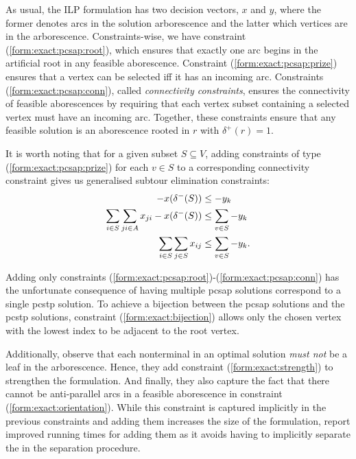  As usual, the ILP formulation has two decision vectors, $x$ and $y$, where the former denotes arcs
 in the solution arborescence and the latter which vertices are in the arborescence. Constraints-wise,
 we have
 constraint (\ref{form:exact:pcsap:root}), which ensures that exactly one arc begins in the artificial
 root in any feasible aborescence. Constraint (\ref{form:exact:pcsap:prize}) ensures
 that a vertex can be selected iff it has an incoming arc.
 Constraints (\ref{form:exact:pcsap:conn}), called \textit{connectivity constraints},
 ensures the connectivity of feasible aborescences by requiring that
 each vertex subset containing a selected vertex must have an incoming arc.
 Together, these constraints ensure that any feasible solution is an aborescence rooted
 in $r$ with $\delta^+(r) = 1$.

 It is worth noting that for a given subset $S \subseteq V$, adding constraints of type
 (\ref{form:exact:pcsap:prize}) for each $v \in S$ to a corresponding connectivity constraint
  gives us generalised subtour elimination constraints:
 \begin{align*}
   -x(\delta^-(S)) &\leq -y_k \\
   \sum_{i \in S} \sum_{ji \in A} x_{ji} - x (\delta^-(S)) &\leq \sum_{v \in S} - y_k \\
   \sum_{i \in S} \sum_{j \in S} x_{ij} &\leq \sum_{v \in S} - y_k \mathnormal{.}
 \end{align*}

 Adding only constraints (\ref{form:exact:pcsap:root})-(\ref{form:exact:pcsap:conn})
 has the unfortunate consequence of having multiple 
 \gls{pcsap} solutions
 correspond
 to a single \gls{pcstp} solution. To achieve a bijection between the \gls{pcsap} solutions and the
 \gls{pcstp} solutions, constraint (\ref{form:exact:bijection}) allows only the chosen vertex
 with the lowest index to be adjacent to the root vertex.
 
 Additionally, \citet{ljubic2005solving} observe that each nonterminal in an optimal solution
 \textit{must not} be a leaf in the arborescence. Hence, they add constraint
 (\ref{form:exact:strength}) to strengthen the formulation. And finally, they
 also capture the fact that there cannot be anti-parallel arcs in a feasible aborescence in
 constraint (\ref{form:exact:orientation}). While this constraint is captured implicitly
 in the previous constraints and adding them increases the size of the formulation,
 \citet{ljubic2005solving} report improved running times for adding them as it avoids
 having to implicitly separate the in the separation procedure.
 
